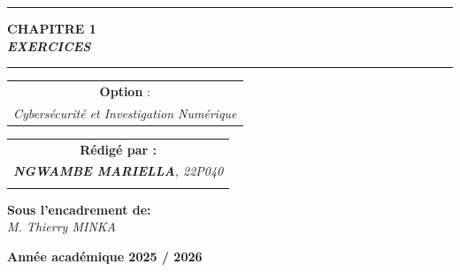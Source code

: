 \documentclass[memoire, 12pt]{report}
\begin{document}
\begin{titlepage}
\begin{center}
		\vspace{0.5cm}
		\begin{tabular}{l*{40}{@{\hskip 3.5cm}c@{\hskip5cm}} p{3.5cm} r}
		\end{tabular}
		
		\noindent\rule{\textwidth}{0.7mm}
		\Large{{\textbf{CHAPITRE 1}}}\\
		\Large{{\textbf{\textit{EXERCICES}}}}
		\noindent\rule{\textwidth}{0.7mm}
	\end{center}
		
	\begin{center}
	\begin{tabular}{c}
		
		\vspace{0.1cm}
		\normalsize
	
	
		\vspace{0.1cm}
		\normalsize\textbf{Option }:\\			
		\textsl{Cybersécurité et Investigation Numérique}
		
	\end{tabular}
	\end{center}
		
	\begin{center}
		\normalsize %
		\begin{tabular}{c}
			\vspace{0.07cm}
			\hspace{0.02cm} \textbf{\textbf{Rédigé par :}}\\
			\hspace{0.02cm} \textsl{\textbf{NGWAMBE  MARIELLA}, 22P040}\\\\
			
		\end{tabular}
	\end{center}
	
	\begin{center}
	\hspace{0.02cm} \textbf{Sous l'encadrement de:}\\
	\hspace{0.02cm} \textsl{M. Thierry MINKA}
	\end{center}
	
    
	\vspace{2cm}
	\begin{center}
		\textbf{Année académique 2025 / 2026}
	\end{center}
		
	\vspace{-1.4cm}
	
		
	\vfill%
	
\end{titlepage}
\end{document}

